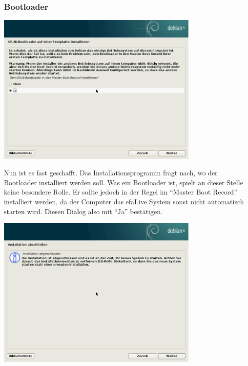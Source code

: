 \documentclass[a4paper,12pt,twoside]{article}
\begin{document}
\subsubsection{Bootloader}
\label{sct:bootloader}

\begin{minipage}{\linewidth}
    \centering
    \captionsetup{type=figure}
    \includegraphics[width=10cm]{screenshots/select_bootloader_mbr.png}
    \label{fig:inst_grub}
\end{minipage}
\bigskip

Nun ist es fast geschafft. Das Installationsprogramm fragt nach, wo der
Bootloader installiert werden soll. Was ein Bootloader ist, spielt an
dieser Stelle keine besondere Rolle. Er sollte jedoch in der Regel im
"`Master Boot Record"' installiert werden, da
der Computer das efaLive System sonst nicht automatisch starten wird.
Diesen Dialog also mit "`Ja"' bestätigen.

\begin{minipage}{\linewidth}
    \centering
    \captionsetup{type=figure}
    \includegraphics[width=10cm]{screenshots/finish_installation.png}
    \label{fig:abschluss}
\end{minipage}
\bigskip
\end{document}
